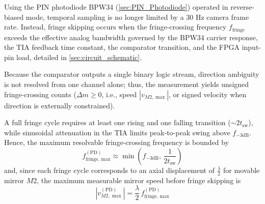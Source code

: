 Using the PIN photodiode BPW34 (\cref{sec:PIN_Photodiode}) operated in reverse-biased mode, temporal sampling is no longer limited by a $30\text{ Hz}$ camera frame rate. Instead, fringe skipping occurs when the fringe-crossing frequency $f_{\text{fringe}}$ exceeds the effective analog bandwidth governed by the BPW34 carrier response, the TIA feedback time constant, the comparator transition, and the FPGA input-pin load, detailed in \cref{sec:circuit_schematic}.

Because the comparator outputs a single binary logic stream, direction ambiguity is not resolved from one channel alone; thus, the measurement yields unsigned fringe-crossing counts ($\Delta m \ge 0$, i.e., speed $|v_{M2, \max}|$, or signed velocity when direction is externally constrained).

A full fringe cycle requires at least one rising and one falling transition ($\sim 2 t_{\text{sw}}$), while sinusoidal attenuation in the TIA limits peak-to-peak swing above $f_{-3\text{dB}}$. Hence, the maximum resolvable fringe-crossing frequency is bounded by
\begin{equation}
    f_{\text{fringe, max}}^{(\text{PD})} \approx \min\!\left(f_{-3\text{dB}},\, \frac{1}{2 t_{\text{sw}}}\right)
    \label{eq:ffringe_max_bpw34}
\end{equation}
and, since each fringe cycle corresponds to an axial displacement of $\frac{\lambda}{2}$ for movable mirror $M2$, the maximum measurable mirror speed before fringe skipping is
\begin{equation}
    |v_{M2, \max}^{(\text{PD})}| = \frac{\lambda}{2}\,f_{\text{fringe, max}}^{(\text{PD})}
    \label{eq:vmax_bpw34_fpga}
\end{equation}

